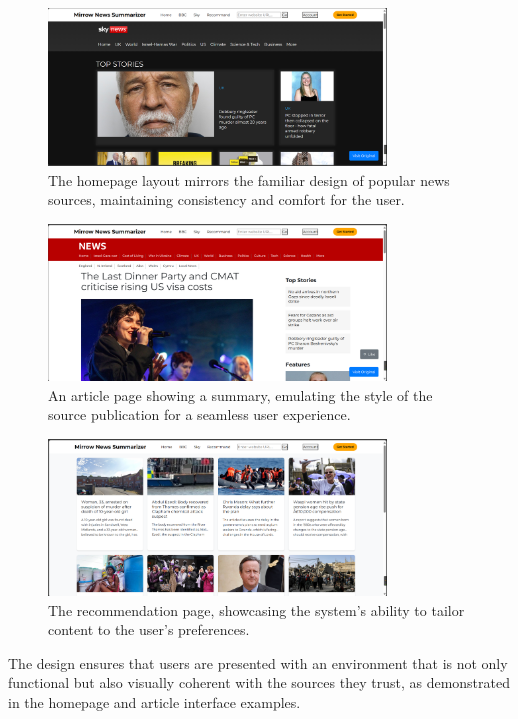\documentclass[10pt]{article}
\begin{document}
\begin{figure}[H]
    \centering
    \includegraphics[width=0.8\textwidth]{../Sky news homepage.png}
    \caption{The homepage layout mirrors the familiar design of popular news sources, maintaining consistency and comfort for the user.}
\end{figure}

\begin{figure}[H]
    \centering
    \includegraphics[width=0.8\textwidth]{../BBC news article.png}
    \caption{An article page showing a summary, emulating the style of the source publication for a seamless user experience.}
\end{figure}

\begin{figure}[H]
    \centering
    \includegraphics[width=0.8\textwidth]{../recommand.png}
    \caption{The recommendation page, showcasing the system's ability to tailor content to the user's preferences.}
\end{figure}

The design ensures that users are presented with an environment that is not only functional but also visually coherent with the sources they trust, as demonstrated in the homepage and article interface examples.
\end{document}

